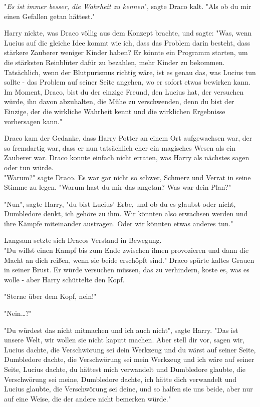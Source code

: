 {"\emph{Es ist immer besser, die Wahrheit zu kennen}", sagte Draco kalt. "Als ob du mir einen Gefallen getan hättest."

Harry nickte, was Draco völlig aus dem Konzept brachte, und sagte: "Was, wenn Lucius auf die gleiche Idee kommt wie ich, dass das Problem darin besteht, dass stärkere Zauberer weniger Kinder haben? Er könnte ein Programm starten, um die stärksten Reinblüter dafür zu bezahlen, mehr Kinder zu bekommen. Tatsächlich, wenn der Blutpurismus richtig wäre, ist es genau das, was Lucius tun sollte - das Problem auf seiner Seite angehen, wo er sofort etwas bewirken kann. Im Moment, Draco, bist du der einzige Freund, den Lucius hat, der versuchen würde, ihn davon abzuhalten, die Mühe zu verschwenden, denn du bist der Einzige, der die wirkliche Wahrheit kennt und die wirklichen Ergebnisse vorhersagen kann."

Draco kam der Gedanke, dass Harry Potter an einem Ort aufgewachsen war, der so fremdartig war, dass er nun tatsächlich eher ein magisches Wesen als ein Zauberer war. Draco konnte einfach nicht erraten, was Harry als nächstes sagen oder tun würde.\\ "Warum?" sagte Draco. Es war gar nicht so schwer, Schmerz und Verrat in seine Stimme zu legen. "Warum hast du mir das angetan? Was war dein Plan?"

"Nun", sagte Harry, "du bist Lucius' Erbe, und ob du es glaubst oder nicht, Dumbledore denkt, ich gehöre zu ihm. Wir könnten also erwachsen werden und ihre Kämpfe miteinander austragen. Oder wir könnten etwas anderes tun."

Langsam setzte sich Dracos Verstand in Bewegung.\\ "Du willst einen Kampf bis zum Ende zwischen ihnen provozieren und dann die Macht an dich reißen, wenn sie beide erschöpft sind." Draco spürte kaltes Grauen in seiner Brust. Er würde versuchen müssen, das zu verhindern, koste es, was es wolle - aber Harry schüttelte den Kopf.

"Sterne über dem Kopf, nein!"

"Nein…?"

"Du würdest das nicht mitmachen und ich auch nicht", sagte Harry. "Das ist unsere Welt, wir wollen sie nicht kaputt machen. Aber stell dir vor, sagen wir, Lucius dachte, die Verschwörung sei dein Werkzeug und du wärst auf seiner Seite, Dumbledore dachte, die Verschwörung sei mein Werkzeug und ich wäre auf seiner Seite, Lucius dachte, du hättest mich verwandelt und Dumbledore glaubte, die Verschwörung sei meine, Dumbledore dachte, ich hätte dich verwandelt und Lucius glaubte, die Verschwörung sei deine, und so halfen sie uns beide, aber nur auf eine Weise, die der andere nicht bemerken würde."

}
